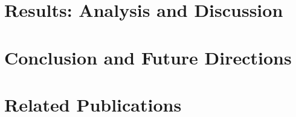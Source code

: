 \documentclass[11pt]{book}
\begin{document}

\chapter{Results: Analysis and Discussion}
\label{ch:chap5}



\chapter{Conclusion and Future Directions}
\label{ch:conclusion}



\chapter*{Related Publications}
\label{ch:relatedPubs}



\printbibliography
\end{document}

